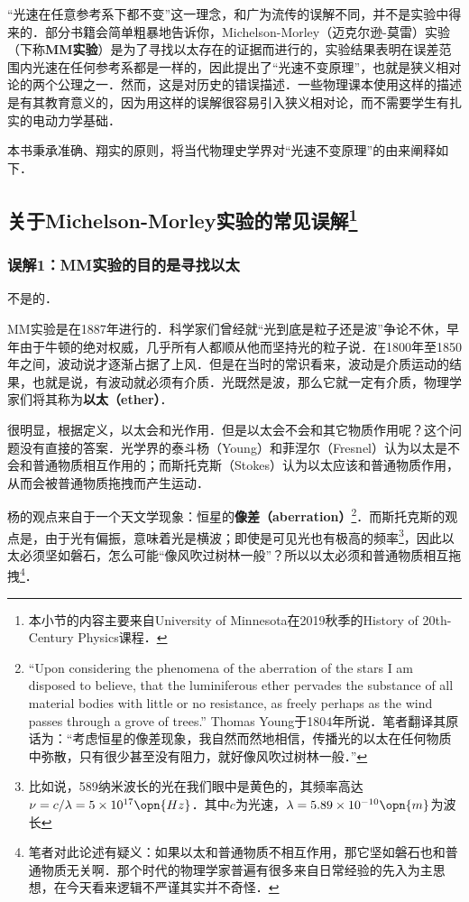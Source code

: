 
“光速在任意参考系下都不变”这一理念，和广为流传的误解不同，并不是实验中得来的．部分书籍会简单粗暴地告诉你，Michelson-Morley（迈克尔逊-莫雷）实验（下称\textbf{MM实验}）是为了寻找以太存在的证据而进行的，实验结果表明在误差范围内光速在任何参考系都是一样的，因此提出了“光速不变原理”，也就是狭义相对论的两个公理之一．然而，这是对历史的错误描述．一些物理课本使用这样的描述是有其教育意义的，因为用这样的误解很容易引入狭义相对论，而不需要学生有扎实的电动力学基础．

本书秉承准确、翔实的原则，将当代物理史学界对“光速不变原理”的由来阐释如下．

\subsection{关于Michelson-Morley实验的常见误解\footnote{本小节的内容主要来自University of Minnesota在2019秋季的History of 20th-Century Physics课程．}}

\subsubsection{误解1：MM实验的目的是寻找以太}

不是的．

MM实验是在1887年进行的．科学家们曾经就“光到底是粒子还是波”争论不休，早年由于牛顿的绝对权威，几乎所有人都顺从他而坚持光的粒子说．在1800年至1850年之间，波动说才逐渐占据了上风．但是在当时的常识看来，波动是介质运动的结果，也就是说，有波动就必须有介质．光既然是波，那么它就一定有介质，物理学家们将其称为\textbf{以太（ether）}．

很明显，根据定义，以太会和光作用．但是以太会不会和其它物质作用呢？这个问题没有直接的答案．光学界的泰斗杨（Young）和菲涅尔（Fresnel）认为以太是不会和普通物质相互作用的；而斯托克斯（Stokes）认为以太应该和普通物质作用，从而会被普通物质拖拽而产生运动．

杨的观点来自于一个天文学现象：恒星的\textbf{像差（aberration）}\footnote{“Upon considering the phenomena
of the aberration of the stars I am disposed to believe, that the luminiferous ether pervades the substance of all material bodies with little or no resistance, as freely perhaps as the wind passes through a grove of trees.” Thomas Young于1804年所说．笔者翻译其原话为：“考虑恒星的像差现象，我自然而然地相信，传播光的以太在任何物质中弥散，只有很少甚至没有阻力，就好像风吹过树林一般．”}．而斯托克斯的观点是，由于光有偏振，意味着光是横波；即使是可见光也有极高的频率\footnote{比如说，589纳米波长的光在我们眼中是黄色的，其频率高达$\nu=c/\lambda=5\times10^{17}\opn{Hz}$．其中$c$为光速，$\lambda=5.89\times10^{-10}\opn{m}$为波长}，因此以太必须坚如磐石，怎么可能“像风吹过树林一般”？所以以太必须和普通物质相互拖拽\footnote{笔者对此论述有疑义：如果以太和普通物质不相互作用，那它坚如磐石也和普通物质无关啊．那个时代的物理学家普遍有很多来自日常经验的先入为主思想，在今天看来逻辑不严谨其实并不奇怪．}．%

